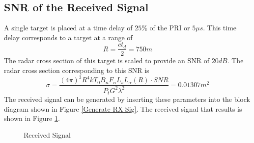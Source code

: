 \documentclass[12pt,letterpaper]{article}
\begin{document}
\subsection{SNR of the Received Signal}
A single target is placed at a time delay  of $25\%$ of the PRI or $5\mu s$. This time delay corresponds to a target at a range of
\begin{equation}
R = \frac{ct_d}{2} = 750 m
\end{equation}
The radar cross section of this target is scaled to provide an SNR of $20dB$. The radar cross section corresponding to this SNR is
\begin{equation}
\sigma = \frac{(4\pi)^3 R^4 k T_0 B_n F_n L_s L_\alpha(R)\cdot SNR}{P_t G^2 \lambda^2} = 0.01307 m^2
\end{equation}
The received signal can be generated by inserting these parameters into the block diagram shown in Figure \ref{Generate RX Sig}. The received signal that results is shown in Figure \ref{ADC Sig}.
\begin{figure}[H]
\caption{Received Signal}
\label{ADC Sig}
\end{figure}
\end{document}
